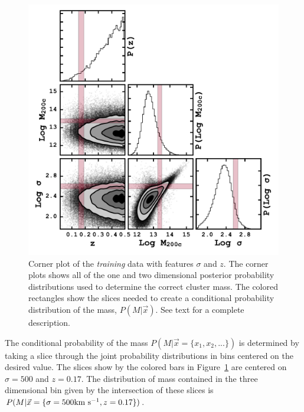 \documentclass[fleqn,usenatbib]{mnras}
\begin{document}
\begin{figure} 
	\includegraphics[width=\columnwidth]{figures/cornertest.pdf} 
	\caption{Corner plot of the \emph{training} data with features $\sigma$ and $z$. The corner plots shows all of the one and two dimensional posterior probability distributions used to determine the correct cluster mass. The colored rectangles show the slices needed to create a conditional probability distribution of the mass, $P(M|\vec{x})$. See text for a complete description. } \label{fig: probability corner} 
\end{figure}

The conditional probability of the mass $P(M|\vec{x}= \{ x_1,x_2,...\})$ is determined by taking a slice through the joint probability distributions in bins centered on the desired value. The slices show by the colored bars in Figure~\ref{fig: probability corner} are centered on $\sigma = 500$ \kms and $z=0.17$. The distribution of mass contained in the three dimensional bin given by the intersection of these slices is $P(M|\vec{x} = \{ \sigma=500 \hbox{km~s$^{-1}$},z=0.17\})$.
\end{document}
